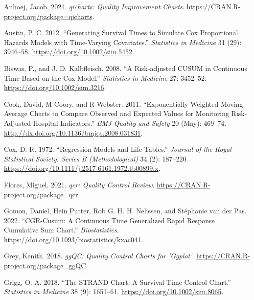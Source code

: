 \hypertarget{refs}{}
\begin{CSLReferences}{1}{0}
\leavevmode{}%
Anhoej, Jacob. 2021. \emph{{qicharts}: Quality Improvement Charts}. \url{https://CRAN.R-project.org/package=qicharts}.

\leavevmode{}%
Austin, P. C. 2012. {``Generating Survival Times to Simulate {Cox} Proportional Hazards Models with Time-Varying Covariates.''} \emph{Statistics in Medicine} 31 (29): 3946--58. \url{https://doi.org/10.1002/sim.5452}.

\leavevmode{}%
Biswas, P., and J. D. Kalbfleisch. 2008. {``A Risk‐adjusted CUSUM in Continuous Time Based on the {C}ox Model.''} \emph{Statistics in Medicine} 27: 3452--52. \url{https://doi.org/10.1002/sim.3216}.

\leavevmode{}%
Cook, David, M Coory, and R Webster. 2011. {``Exponentially Weighted Moving Average Charts to Compare Observed and Expected Values for Monitoring Risk-Adjusted Hospital Indicators.''} \emph{BMJ Quality and Safety} 20 (May): 469--74. \url{http://dx.doi.org/10.1136/bmjqs.2008.031831}.

\leavevmode{}%
Cox, D. R. 1972. {``Regression Models and Life-Tables.''} \emph{Journal of the Royal Statistical Society. Series B (Methodological)} 34 (2): 187--220. \url{https://doi.org/10.1111/j.2517-6161.1972.tb00899.x}.

\leavevmode{}%
Flores, Miguel. 2021. \emph{{qcr}: Quality Control Review}. \url{https://CRAN.R-project.org/package=qcr}.

\leavevmode{}%
Gomon, Daniel, Hein Putter, Rob G. H. H. Nelissen, and Stéphanie van der Pas. 2022. {``CGR-Cusum: A Continuous Time Generalized Rapid Response Cumulative Sum Chart.''} \emph{Biostatistics}. \url{https://doi.org/10.1093/biostatistics/kxac041}.

\leavevmode{}%
Grey, Kenith. 2018. \emph{ggQC: Quality Control Charts for 'Ggplot'}. \url{https://CRAN.R-project.org/package=ggQC}.

\leavevmode{}%
Grigg, O. A. 2018. {``The {STRAND} Chart: A Survival Time Control Chart.''} \emph{Statistics in Medicine} 38 (9): 1651--61. \url{https://doi.org/10.1002/sim.8065}.


\end{CSLReferences}
